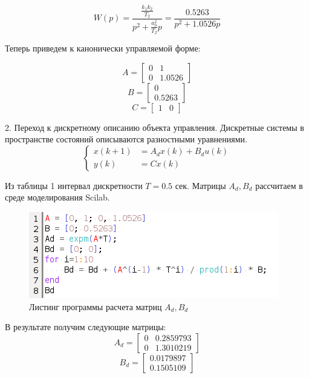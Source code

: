 \documentclass[a4paper,14pt]{extreport}
\begin{document}
	\begin{equation}
	W(p) = \frac{\frac{k_1 k_2}{T_2}}{p^2 + \frac{a_0^2}{T_2} p} = \frac{0.5263}{p^2 + 1.0526  p} 
	\end{equation}
	
	Теперь приведем к канонически управляемой форме:
	
	\begin{equation}
	A=
	\begin{bmatrix}
	0&1\\
	0& 1.0526
	\end{bmatrix}
	\end{equation}
	\begin{equation}
	B=
	\begin{bmatrix}
	0\\
	0.5263
	\end{bmatrix}
	\end{equation}
	\begin{equation}
	C=
	\begin{bmatrix}
	1&0
	\end{bmatrix}
	\end{equation}
	
	2. Переход к дискретному описанию объекта управления.
	Дискретные системы в пространстве состояний описываются разностными уравнениями.
	\begin{equation}
	\begin{cases}
	x(k+1) &= A_d x(k) + B_d u(k)\\
	y(k) &= C x(k)
	\end{cases}
	\end{equation}
	
	Из таблицы 1 интервал дискретности $T = 0.5$ сек.
	Матрицы $A_d, B_d$ рассчитаем в среде моделирования Scilab.
	\begin{figure}[H]
		\center\includegraphics[width=0.5\linewidth]{adbd.png}
		\caption{Листинг программы расчета матриц $A_d, B_d$}
		\label{fig:scr1}
	\end{figure}
	В результате получим следующие матрицы:
	\begin{equation}
	A_d=
	\begin{bmatrix}
	0&0.2859793\\
	0& 1.3010219
	\end{bmatrix}
	\end{equation}
	\begin{equation}
	B_d=
	\begin{bmatrix}
	0.0179897\\
	0.1505109
	\end{bmatrix}
	\end{equation}
	
\end{document}
